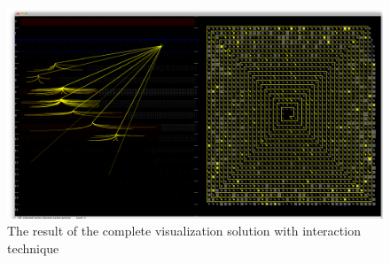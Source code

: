\newpage
\begin{figure}[h!]
\centering
\includegraphics[scale=0.33, angle=90]{pictures/complete_solution_overview.png}
\caption{The result of the complete visualization solution with interaction technique}
\label{fig:complete_solution_overview}
\end{figure}